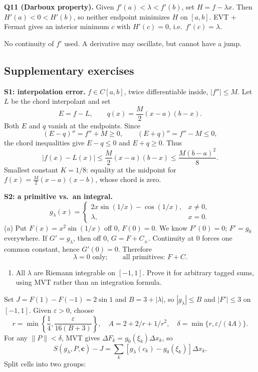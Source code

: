 \documentclass[11pt,letterpaper]{article}
\newcommand{\tightlist}{\setlength{\itemsep}{0pt}\setlength{\parskip}{0pt}}
\begin{document}
\textbf{Q11 (Darboux property).} Given \(f'(a)<\lambda<f'(b)\), set
\(H=f-\lambda x\). Then \(H'(a)<0<H'(b)\), so neither endpoint minimizes
\(H\) on \([a,b]\). EVT + Fermat gives an interior minimum \(c\) with
\(H'(c)=0\), i.e.~\(f'(c)=\lambda\).

No continuity of \(f'\) used. A derivative may oscillate, but cannot
have a jump.

\subsection{Supplementary exercises}\label{supplementary-exercises}

\textbf{S1: interpolation error.} \(f\in C[a,b]\), twice differentiable
inside, \(|f''|\le M\). Let \(L\) be the chord interpolant and set \[
E=f-L,\qquad q(x)=\frac M2(x-a)(b-x).
\] Both \(E\) and \(q\) vanish at the endpoints. Since \[
(E-q)''=f''+M\ge0,\qquad (E+q)''=f''-M\le0,
\] the chord inequalities give \(E-q\le0\) and \(E+q\ge0\). Thus \[
|f(x)-L(x)|\le\frac M2(x-a)(b-x)\le\frac{M(b-a)^2}8.
\] Smallest constant \(K=1/8\): equality at the midpoint for
\(f(x)=\frac M2(x-a)(x-b)\), whose chord is zero.

\textbf{S2: a primitive vs.~an integral.} \[
g_\lambda(x)=\begin{cases}2x\sin(1/x)-\cos(1/x),&x\ne0,\\\lambda,&x=0.\end{cases}
\] (a) Put \(F(x)=x^2\sin(1/x)\) off \(0\), \(F(0)=0\). We know
\(F'(0)=0\); \(F'=g_0\) everywhere. If \(G'=g_\lambda\), then off \(0\),
\(G=F+C_\pm\). Continuity at \(0\) forces one common constant, hence
\(G'(0)=0\). Therefore \[
\lambda=0\text{ only};\qquad\text{all primitives: }F+C.
\]

\begin{enumerate}
\def\labelenumi{(\alph{enumi})}
\setcounter{enumi}{1}
\tightlist
\item
  All \(\lambda\) are Riemann integrable on \([-1,1]\). Prove it for
  arbitrary tagged sums, using MVT rather than an integration formula.
\end{enumerate}

Set \(J=F(1)-F(-1)=2\sin1\) and \(B=3+|\lambda|\), so
\(|g_\lambda|\le B\) and \(|F'|\le3\) on \([-1,1]\). Given
\(\varepsilon>0\), choose \[
r=\min\left\{\frac14,\frac{\varepsilon}{16(B+3)}\right\},\quad
A=2+2/r+1/r^2,\quad \delta=\min\{r,\varepsilon/(4A)\}.
\] For any \(\|P\|<\delta\), MVT gives
\(\Delta F_k=g_0(\xi_k)\Delta x_k\), so \[
S(g_\lambda,P,\mathbf c)-J
=\sum_k[g_\lambda(c_k)-g_0(\xi_k)]\Delta x_k.
\] Split cells into two groups:
\end{document}
